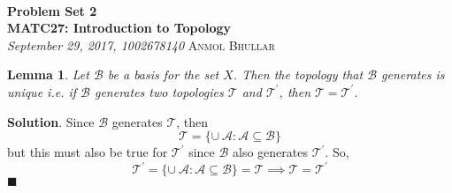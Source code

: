 \documentclass[12pt]{article}
\renewcommand{\=}[1]{\stackrel{#1}{=}} %
\providecommand{\T}{\mathcal{T}}
\newtheorem*{lem}{Lemma}
\theoremstyle{definition}
\newenvironment{s}{%
        \begin{trivlist} \item \textbf{Solution}. }{%
            \hspace*{\fill} $\blacksquare$\end{trivlist}}%
\begin{document}
{\noindent\Huge\bf  \\[0.5\baselineskip] {\selectfont  %
Problem Set 2}         }\\[2\baselineskip] %
{ {\bf {}\selectfont MATC27: Introduction to Topology}\\ {\textit{%
\selectfont September 29, 2017, 1002678140}}}
{\large \textsc{Anmol Bhullar}} %
\\[1.4\baselineskip]

\begin{lem}
    Let $\mathcal{B}$ be a basis for the set $X$. Then the topology that $\mathcal{B}$ generates is unique i.e. if $\mathcal{B}$
    generates two topologies $\T$ and $\T^{'}$, then $\T = \T^{'}$.
\end{lem}
\begin{s}
    Since $\mathcal{B}$ generates $\T$, then
    \[ \T = \{\cup\: \mathcal{A}: \mathcal{A}\subseteq\mathcal{B}\} \]
    but this must also be true for $\T^{'}$ since $\mathcal{B}$ also generates $\T^{'}$. So,
    \[ \T^{'} = \{\cup\: \mathcal{A}: \mathcal{A}\subseteq\mathcal{B}\} = \T \implies \T = \T^{'} \]
\end{s}
\end{document}

